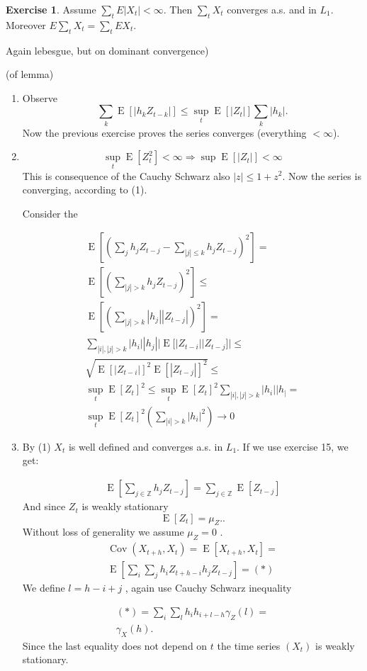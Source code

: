 \documentclass[12pt,a4paper, notitlepage]{book}
\theoremstyle{definition} %
\newtheorem{exercise}{Exercise}[chapter]
\theoremstyle{plain} %
\newcommand{\Z}{\mathbb Z}
\DeclareMathOperator{\Cov}{Cov}
\DeclareMathOperator{\E}{E}
\begin{document}
\begin{exercise}
Assume $\sum_t E|X_t| < \infty$. Then $\sum_t X_t$ converges a.s. and in $L_1$. Moreover $E\sum_t X_t = \sum_t E X_t$.
\end{exercise}
\begin{hint}
Again lebesgue, but on dominant convergence)
\end{hint}

\proof (of lemma)
\begin{enumerate}
\item Observe 
\[ \sum_k \E[|h_k Z_{t-k}|] \leq \sup_t \E[|Z_t|] \sum_k |h_k|. \]
 Now the previous exercise proves the series converges (everything $< \infty$). 

\item 
\[ \sup_t \E[ Z_t^2 ] < \infty \Rightarrow \sup \E [ | Z_t | ] < \infty \]
This is consequence of the Cauchy Schwarz  also $ |z| \leq 1 + z^2. $ 
Now the series is converging, according to (1). 

Consider the 

\begin{align*} 
\E\left[\left(\sum_j h_j Z_{t-j} - \sum_{|j|\leq k} h_j Z_{t-j}\right)^2 \right] = \\
\E \left[ \left( \sum_{|j| > k} h_j Z_{t-j} \right)^2 \right]  \leq  \\ 
\E\left[ \left(\sum_{|j| > k} |h_j| |Z_{t-j}| \right)^2  \right] = \\
 \sum_{ |i|,|j| > k} |h_i||h_j|  |\E[ |Z_{t-i}||Z_{t-j}  ] |\leq \\
\sqrt{ \E [ | Z_{t-i} |]^2 \E [ | Z_{t-j} | ]^2 }   \leq \\ 
\sup _t \E [ Z_t]^2 \leq 
\sup _t \E [Z_t] ^2 \sum _{|i|, |j|>k} |h_i | |h_| = \\
 \sup _t \E [ Z_t ] ^2 \left( \sum _{|i|>k} |h_i|^2 \right)  \rightarrow 0
\end{align*}
\item
By (1) $ X_t $ is well defined and converges a.s. in $L_1 $. If we use exercise 15, we get:

\begin{align*}
\E \left[ \sum _{j \in \Z} h_j Z_{t-j} \right] = \sum _{j \in \Z} \E[ Z_{t-j} ] \end{align*}
And since $ Z_t $ is weakly stationary 
\[  \E [ Z_t] = \mu _Z . . \]
Without loss of generality we assume $ \mu _Z = 0 $ . 
\begin{align*} \Cov(X_{t+h} , X_t) = \E [ X_{t+h}, X_t ] = \\
\E\left[ \sum_i \sum _j h_i Z_{t+h-i} h_j Z_{t-j} \right] = (*) 
\end{align*}
We define $ l = h-i+j $ , again use Cauchy Schwarz inequality 

\begin{align*}
(*) =  \sum_i \sum_l  h_i h_{i+l-h} \gamma _Z(l) = \\
\gamma _X(h) . \end{align*}
Since the last equality does not depend on $ t $ the time series $ (X_t) $ is weakly stationary.

\end{enumerate}
\endproof
\end{document}
